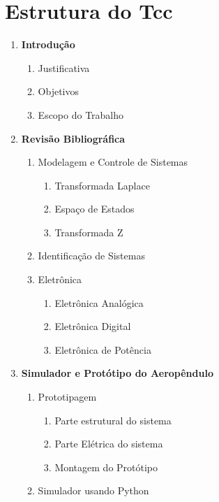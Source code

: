 \documentclass[12pt,oneside,a4paper,brazil]{article}
\begin{document}
	\renewcommand{\labelenumii}{\arabic{enumi}.\arabic{enumii}}
	\renewcommand{\labelenumiii}{\arabic{enumi}.\arabic{enumii}.\arabic{enumiii}}
	\renewcommand{\labelenumiv}{\arabic{enumi}.\arabic{enumii}.\arabic{enumiii}.\arabic{enumiv}}
	\section*{Estrutura do Tcc}
	\color{normal}
	
	\begin{enumerate}
		\item \textbf{Introdução}
		\begin{enumerate}
			\item Justificativa
			\item Objetivos
			\item Escopo do Trabalho
		\end{enumerate}


		\item \textbf{Revisão Bibliográfica}
		\begin{enumerate}
			\item Modelagem e Controle de Sistemas
			\begin{enumerate}
				\item Transformada Laplace
				\item Espaço de Estados
				\item Transformada Z
			\end{enumerate}
			\item Identificação de Sistemas
			\item Eletrônica
			\begin{enumerate}
				\item Eletrônica Analógica
				\item Eletrônica Digital
				\item Eletrônica de Potência
			\end{enumerate}
		\end{enumerate}
	
	
		\item \textbf{Simulador e Protótipo do Aeropêndulo}
		\begin{enumerate}
			\item Prototipagem
			\begin{enumerate}
				\item Parte estrutural do sistema
				\item Parte Elétrica do sistema
				\item Montagem do Protótipo
			\end{enumerate}
			\item Simulador usando Python
		\end{enumerate}
		

\end{enumerate}
\end{document}
